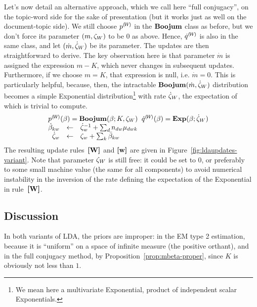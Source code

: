Let's now detail an alternative approach, which we call here ``full conjugacy'', on the topic-word side for the sake of presentation (but it works just as well on the document-topic side). We still choose ${p}^{(\!{W}\!)}$ in the $\mathbf{Boojum}$ class as before, but we don't force its parameter $(m,\zeta_W)$ to be $0$ as above. Hence, ${\dot{q}}^{(\!{W}\!)}$ is also in the same class, and let $(\dot{m},\dot{\zeta}_W)$ be its parameter. The updates are then straightforward to derive. The key observation here is that parameter $\dot{m}$ is assigned the expression $m-K$, which never changes in subsequent updates. Furthermore, if we choose $m=K$, that expression is null, i.e. $\dot{m}=0$. This is particularly helpful, because, then, the intractable $\mathbf{Boojum}(\dot{m},\dot{\zeta}_W)$ distribution becomes a simple Exponential distribution\footnote{We mean here a multivariate Exponential, product of independent scalar Exponentials.} with rate $\dot{\zeta}_W$, the expectation of which is trivial to compute.
\[
\begin{array}{rcl}
\multicolumn{3}{c}{
\cpnt{p}{W}(\vmW) = \mbeta(\vmW;K,\pmW_W)
\;\;
\cpnt{\dot{q}}{W}(\vmW) = \textbf{Exp}(\vmW;\vvmW_W)
} \\
\vvmKW_{kw} & \assignn & \vvmW_w^{-1}+\sum_dn_{dw}\vvmDWK_{dwk} \\
\vvmW_w & \assignn & \pmW_w+\sum_k\vvmbKW_{kw}
\end{array}
\]
The resulting update rules~$\textbf{[W]}$ and  $\textbf{[w]}$ are given in Figure~\ref{fig:ldaupdates-variant}. Note that parameter $\zeta_W$ is still free: it could be set to $0$, or preferably to some small machine value (the same for all components) to avoid numerical instability in the inversion of the rate defining the expectation of the Exponential in rule~$\textbf{[W]}$.
\subsection{Discussion}
In both variants of LDA, the priors are improper: in the EM type 2 estimation, because it is ``uniform'' on a space of infinite measure (the positive orthant), and in the full conjugacy method, by Proposition~\ref{prop:mbeta-proper}, since $K$ is obviously not less than $1$.

